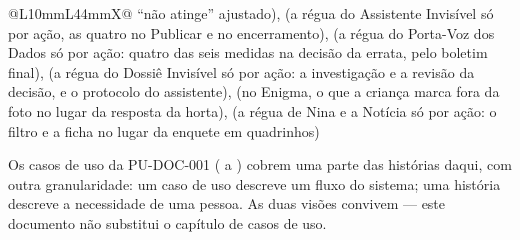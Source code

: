 \begin{tabularx}{\linewidth}{@{}L{10mm}L{44mm}X@{}}
  \enquote{não atinge} ajustado),  (a régua do Assistente
  Invisível só por ação, as quatro no Publicar e no encerramento),
   (a régua do Porta-Voz dos Dados só por ação: quatro das seis
  medidas na decisão da errata, pelo boletim final),  (a
  régua do Dossiê Invisível só por ação: a investigação e a revisão da
  decisão, e o protocolo do assistente),
   (no Enigma, o que a
  criança marca fora da foto no lugar da resposta da horta), 
  (a régua de Nina e a Notícia só por ação: o filtro e a ficha no lugar da
  enquete em quadrinhos)\\
\bottomrule
\end{tabularx}

\begin{nota}
Os casos de uso da PU-DOC-001 ( a ) cobrem uma parte das
histórias daqui, com outra granularidade: um caso de uso descreve um fluxo do
sistema; uma história descreve a necessidade de uma pessoa. As duas visões
convivem --- este documento não substitui o capítulo de casos de uso.
\end{nota}
